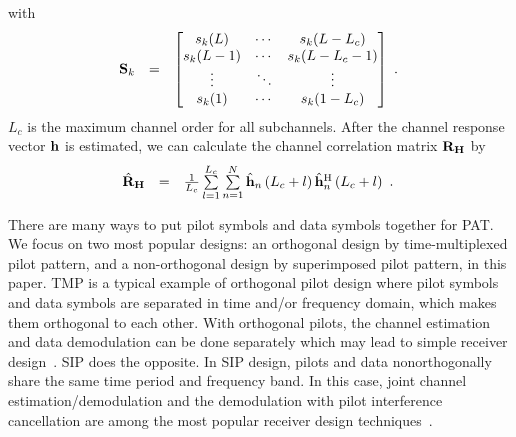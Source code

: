 \documentclass[10pt,fleqn, twocolumn]{IEEEtran}
\newcommand{\bh}{{\bf h}}
\newcommand{\bH}{{\bf H}}
\newcommand{\bS}{{\bf S}}
\newcommand{\bR}{{\bf R}}
\begin{document}
\noindent with
\begin{equation}\hspace{-0.10in}
\begin{array}{rcl}
\bS_{k}&=&\left[\begin{matrix}
s_{k}(L)&\cdots&s_{k}(L-L_{c})\\
s_{k}(L-1)&\cdots&s_{k}(L-L_{c}-1)\\
\vdots&\ddots&\vdots\\
s_{k}(1)&\cdots&s_{k}(1-L_{c})
\end{matrix}\right]
\end{array}.\label{S_k}
\end{equation}
\noindent $L_{c}$ is the maximum channel order for all
subchannels. After the channel response vector $\bh$ is estimated,
we can calculate the channel correlation matrix $\bR_{\bH}$ by
\begin{equation}\hspace{-0.1in}
\begin{array}{rcl}
\hat{\bR}_{\bH}&=&\frac{1}{L_{c}}\sum\limits_{l=1}^{L_{c}}\sum\limits_{n=1}^{N}\hat{\bh}_{n}\left(L_{c}+l\right)\hat{\bh}_{n}^{\rm
H}\left(L_{c}+l\right)
\end{array}.\label{R_h_actual}
\end{equation}

There are many ways to put pilot symbols and data symbols together
for PAT. We focus on two most popular designs: an {orthogonal
design} by {time-multiplexed pilot pattern}, and a {non-orthogonal
design} by {superimposed pilot pattern}, in this paper. TMP is a
typical example of orthogonal pilot design where pilot symbols and
data symbols are separated in time and/or frequency domain, which
makes them orthogonal to each other. With orthogonal pilots, the
channel estimation and data demodulation can be done separately
which may lead to simple receiver design~\cite{Dong02}. SIP does
the opposite. In SIP design, pilots and data nonorthogonally share
the same time period and frequency band. In this case, joint
channel estimation/demodulation and the demodulation with pilot
interference cancellation are among the most popular receiver
design techniques~\cite{Coldrey06}.
\end{document}
